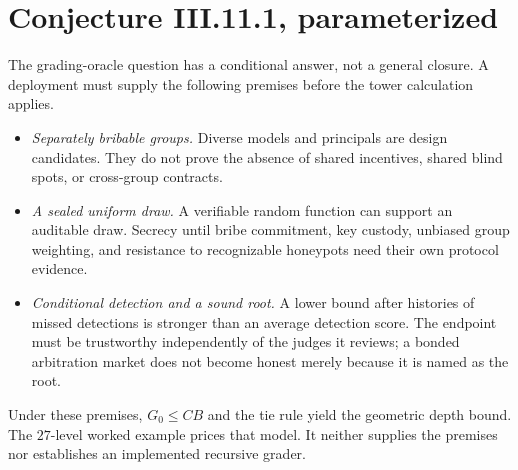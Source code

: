 \documentclass[11pt,a4paper]{article}
\begin{document}
\section{Conjecture III.11.1, parameterized}\label{sec:conjecture}
The grading-oracle question has a conditional answer, not a general closure. A deployment must supply the following premises before the tower calculation applies.
\begin{itemize}[leftmargin=1.6em,itemsep=1pt]
\item \emph{Separately bribable groups.} Diverse models and principals are design candidates. They do not prove the absence of shared incentives, shared blind spots, or cross-group contracts.
\item \emph{A sealed uniform draw.} A verifiable random function \cite{mrv1999} can support an auditable draw. Secrecy until bribe commitment, key custody, unbiased group weighting, and resistance to recognizable honeypots need their own protocol evidence.
\item \emph{Conditional detection and a sound root.} A lower bound after histories of missed detections is stronger than an average detection score. The endpoint must be trustworthy independently of the judges it reviews; a bonded arbitration market does not become honest merely because it is named as the root.
\end{itemize}
Under these premises, $G_0\le CB$ and the tie rule yield the geometric depth bound. The $27$-level worked example prices that model. It neither supplies the premises nor establishes an implemented recursive grader.
\end{document}
